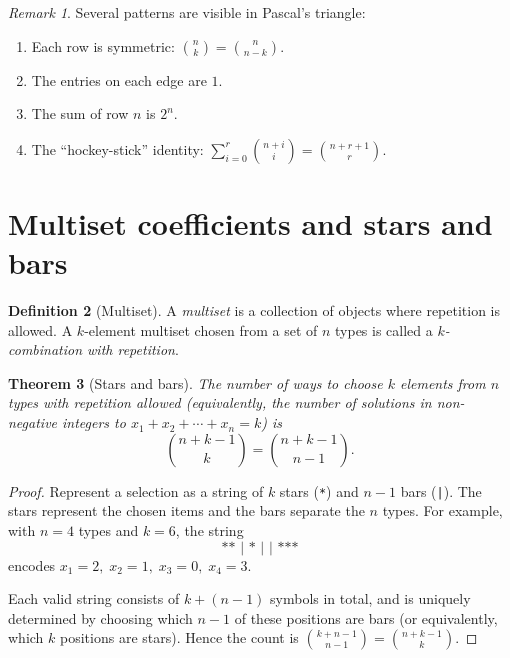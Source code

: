 \documentclass[12pt,a4paper,openany]{book}
\theoremstyle{definition}
\newtheorem{definition}{Definition}[chapter]
\theoremstyle{plain}
\newtheorem{theorem}[definition]{Theorem}
\theoremstyle{remark}
\newtheorem{remark}[definition]{Remark}
\begin{document}
\begin{remark}\label{rem:pascal-patterns}
Several patterns are visible in Pascal's triangle:
\begin{enumerate}[label=(\roman*)]
  \item Each row is symmetric: $\binom{n}{k} = \binom{n}{n-k}$.
  \item The entries on each edge are $1$.
  \item The sum of row $n$ is $2^n$.
  \item The ``hockey-stick'' identity: $\sum_{i=0}^{r}\binom{n+i}{i} = \binom{n+r+1}{r}$.
\end{enumerate}
\end{remark}

\section{Multiset coefficients and stars and bars}
\label{sec:stars-bars}

\begin{definition}[Multiset]\label{def:multiset}
A \emph{multiset} is a collection of objects where repetition is allowed.
A $k$-element multiset chosen from a set of $n$ types is called a
\emph{$k$-combination with repetition}.
\end{definition}

\begin{theorem}[Stars and bars]\label{thm:stars-bars}
The number of ways to choose $k$ elements from $n$ types with repetition
allowed (equivalently, the number of solutions in non-negative integers to
$x_1 + x_2 + \cdots + x_n = k$) is
\[
  \binom{n + k - 1}{k} = \binom{n + k - 1}{n - 1}.
\]
\end{theorem}

\begin{proof}
Represent a selection as a string of $k$ stars (\texttt{*}) and $n - 1$ bars
(\texttt{|}). The stars represent the chosen items and the bars separate the
$n$ types. For example, with $n = 4$ types and $k = 6$, the string
\[
  \texttt{** | * | | ***}
\]
encodes $x_1 = 2,\; x_2 = 1,\; x_3 = 0,\; x_4 = 3$.

Each valid string consists of $k + (n-1)$ symbols in total, and is uniquely
determined by choosing which $n - 1$ of these positions are bars (or
equivalently, which $k$ positions are stars). Hence the count is
$\binom{k + n - 1}{n - 1} = \binom{n + k - 1}{k}$.
\end{proof}
\end{document}

